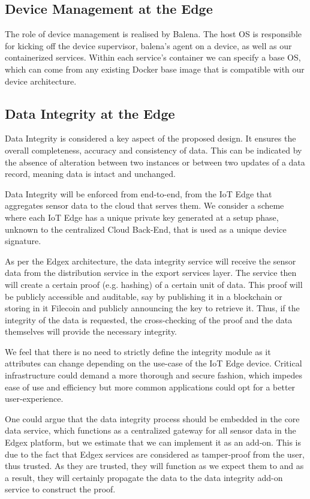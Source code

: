 \subsection{Device Management at the Edge}

The role of device management is realised by Balena. The host OS is responsible for kicking off the device supervisor, balena’s agent on a device, as well as our containerized services. Within each service's container we can specify a base OS, which can come from any existing Docker base image that is compatible with our device architecture.  

\subsection{Data Integrity at the Edge}

Data Integrity is considered a key aspect of the proposed design. It ensures the overall completeness, accuracy and consistency of data. This can be indicated by the absence of alteration between two instances or between two updates of a data record, meaning data is intact and unchanged.
 
Data Integrity will be enforced from end-to-end, from the IoT Edge that aggregates sensor data to the cloud that serves them. We consider a scheme where each IoT Edge has a unique private key generated at a setup phase, unknown to the centralized Cloud Back-End, that is used as a unique device signature.
 
As per the Edgex architecture, the data integrity service will receive the sensor data from the distribution service in the export services layer. The service then will create a certain proof (e.g. hashing) of a certain unit of data. This proof will be publicly accessible and auditable, say by publishing it in a blockchain or storing in it Filecoin and publicly announcing the key to retrieve it. Thus, if the integrity of the data is requested, the cross-checking of the proof and the data themselves will provide the necessary integrity. 

We feel that there is no need to strictly define the integrity module as it attributes can change depending on the use-case of the IoT Edge device. Critical infrastructure could demand a more thorough and secure fashion, which impedes ease of use and efficiency but more common applications could opt for a better user-experience.
 
One could argue that the data integrity process should be embedded in the core data service, which functions as a centralized gateway for all sensor data in the Edgex platform, but we estimate that we can implement it as an add-on. This is due to the fact that Edgex services are considered as tamper-proof from the user, thus trusted. As they are trusted, they will function as we expect them to and as a result, they will  certainly propagate the data to the data integrity add-on service to construct the proof.
 
